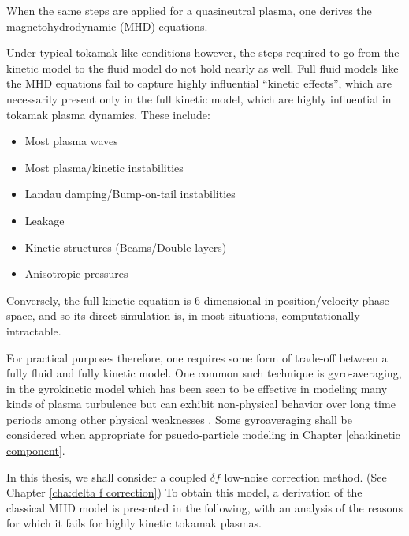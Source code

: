     When the same steps are applied for a quasineutral plasma, one derives the magnetohydrodynamic (MHD) equations. 
    
    Under typical tokamak-like conditions however, the steps required to go from the kinetic model to the fluid model do not hold nearly as well. Full fluid models like the MHD equations fail to capture highly influential ``kinetic effects'', which are necessarily present only in the full kinetic model, which are highly influential in tokamak plasma dynamics. These include:
    \begin{itemize}
        \item  Most plasma waves \BA{[Ref]}
        \item  Most plasma/kinetic instabilities \BA{[Ref]}
        \item  Landau damping/Bump-on-tail instabilities \BA{[Ref]}
        \item  Leakage \BA{[Ref]}
        \item  Kinetic structures (Beams/Double layers) \BA{[Ref]}
        \item  Anisotropic pressures \BA{[Ref]}
    \end{itemize}
    Conversely, the full kinetic equation is 6-dimensional in position/velocity phase-space, and so its direct simulation is, in most situations, computationally intractable.

    For practical purposes therefore, one requires some form of trade-off between a fully fluid and fully kinetic model. One common such technique is gyro-averaging, in the gyrokinetic model \cite{Howes_et_al_2006, Parra_Barnes_Peters_2011, Abel_et_al_2013} which has been seen to be effective in modeling many kinds of plasma turbulence \cite{McKee_et_al_2001} but can exhibit non-physical behavior over long time periods \BA{[Ref]} among other physical weaknesses \BA{[Ref]}. Some gyroaveraging shall be considered when appropriate for psuedo-particle modeling in Chapter \ref{cha:kinetic component}. 
    
    In this thesis, we shall consider a coupled $\delta\! f$ low-noise correction method. (See Chapter \ref{cha:delta f correction}) To obtain this model, a derivation of the classical MHD model is presented in the following, with an analysis of the reasons for which it fails for highly kinetic tokamak plasmas.

    
    
    
    
